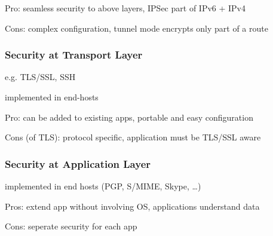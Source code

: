 \documentclass[fs, footer]{latex4ei}
\begin{document}
\begin{multicols*}{4}
{Pro: seamless security to above layers, IPSec part of IPv6 + IPv4

Cons: complex configuration, tunnel mode encrypts only part of a route


\subsubsection{Security at Transport Layer}
e.g. TLS/SSL, SSH

implemented in end-hosts

Pro: can be added to existing apps, portable and easy configuration

Cons (of TLS): protocol specific, application must be TLS/SSL aware


\subsubsection{Security at Application Layer}

implemented in end hosts (PGP, S/MIME, Skype, \ldots)

Pros: extend app without involving OS, applications understand data

Cons: seperate security for each app
}

\end{multicols*}
\end{document}
